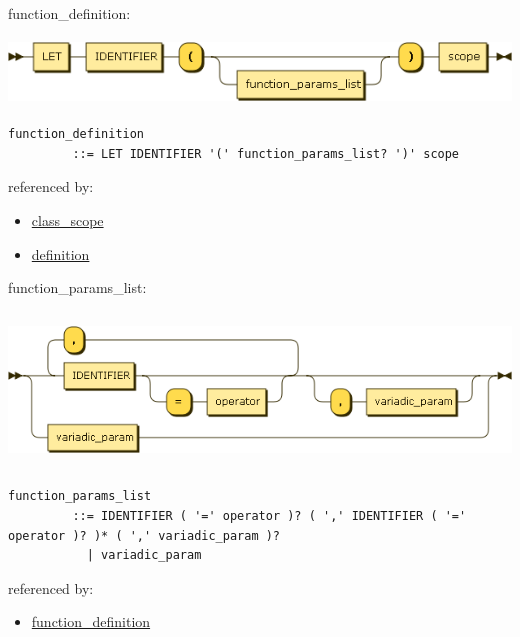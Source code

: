 \begin{minipage}{\textwidth}
\protect\hypertarget{function_definition}{}{function\_definition:}

\includegraphics[width=5.97917in,height=0.70833in]{diagram/function_definition.png}

\begin{verbatim}
function_definition
         ::= LET IDENTIFIER '(' function_params_list? ')' scope
\end{verbatim}

referenced by:

\begin{itemize}
\tightlist
\item
  \protect\hyperlink{class_scope}{class\_scope}
\item
  \protect\hyperlink{definition}{definition}
\end{itemize}

\end{minipage}

\begin{minipage}{\textwidth}
\protect\hypertarget{function_params_list}{}{function\_params\_list:}

\includegraphics[width=6.45833in,height=1.62500in]{diagram/function_params_list.png}

\begin{verbatim}
function_params_list
         ::= IDENTIFIER ( '=' operator )? ( ',' IDENTIFIER ( '=' operator )? )* ( ',' variadic_param )?
           | variadic_param
\end{verbatim}

referenced by:

\begin{itemize}
\tightlist
\item
  \protect\hyperlink{function_definition}{function\_definition}
\end{itemize}

\end{minipage}

